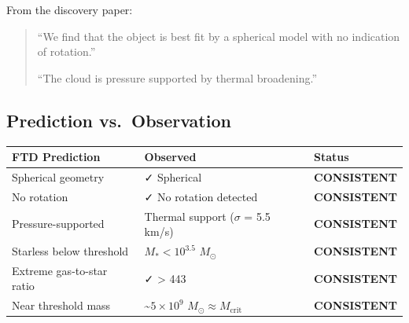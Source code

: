 \documentclass[
  11pt,
  letterpaper,
  twoside,
  openany]{book}
\makeatletter
\let\orig@subsection\subsection
\renewcommand{\subsection}{\needspace{6\baselineskip}\orig@subsection}
\makeatother
\begin{document}
From the discovery paper:

\begin{quote}
``We find that the object is best fit by a spherical model with no
indication of rotation.''

``The cloud is pressure supported by thermal broadening.''
\end{quote}

\subsection{Prediction
vs.~Observation}\label{prediction-vs.-observation}

\begin{longtable}[]{@{}
  >{\raggedright\arraybackslash}p{}
  >{\raggedright\arraybackslash}p{}
  >{\raggedright\arraybackslash}p{}@{}}
\toprule\noalign{}
\begin{minipage}[b]{\linewidth}\raggedright
FTD Prediction
\end{minipage} & \begin{minipage}[b]{\linewidth}\raggedright
Observed
\end{minipage} & \begin{minipage}[b]{\linewidth}\raggedright
Status
\end{minipage} \\
\midrule\noalign{}
\endhead
\bottomrule\noalign{}
\endlastfoot
Spherical geometry & ✓ Spherical & \textbf{CONSISTENT} \\
No rotation & ✓ No rotation detected & \textbf{CONSISTENT} \\
Pressure-supported & Thermal support (\(\sigma\) = 5.5 km/s) &
\textbf{CONSISTENT} \\
Starless below threshold & \(M_* < 10^{3.5}\) \(M_\odot\) &
\textbf{CONSISTENT} \\
Extreme gas-to-star ratio & ✓ \textgreater{} 443 &
\textbf{CONSISTENT} \\
Near threshold mass & \textasciitilde{}\(5 \times 10^9\)
\(M_\odot \approx M_{\text{crit}}\) & \textbf{CONSISTENT} \\
\end{longtable}
\end{document}
